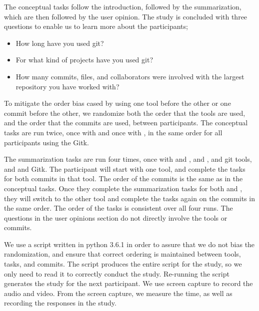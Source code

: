The conceptual tasks follow the introduction, followed by the
summarization, which are then followed by the user opinion. The study is
concluded with three questions to enable us to learn more about the
participants;

\begin{itemize}
  \item How long have you used git?
  \item For what kind of projects have you used git?
  \item How many commits, files, and collaborators were involved with
    the largest repository you have worked with?
\end{itemize}

To mitigate the order bias cased by using one tool before the other or
one commit before the other, we randomize both the order that the tools
are used, and the order that the commits are used, between participants.
The conceptual tasks are run twice, once with \comA and once with \comB,
in the same order for all participants using the Gitk.

 The summarization tasks are run
four times, once with \comA and \tool, \comB and \tool, \comA and git
tools, and \comB and Gitk. The participant will start with one
tool, and complete the tasks for both commits in that tool. The order of
the commits is the same as in the conceptual tasks. Once they complete
the summarization tasks for both \comA and \comB, they will switch to
the other tool and complete the tasks again on the commits in the same
order. The order of the tasks is consistent over all four runs. The
questions in the user opinions section do not directly involve the tools
or commits.

We use a script written in python 3.6.1 in order to assure that we do
not bias the randomization, and ensure that correct ordering is
maintained between tools, tasks, and commits. The script produces the
entire script for the study, so we only need to read it to correctly
conduct the study. Re-running the script generates the study for the
next participant. We use screen capture to record the audio and video.
From the screen capture, we measure the time, as well as recording the
responses in the study.


